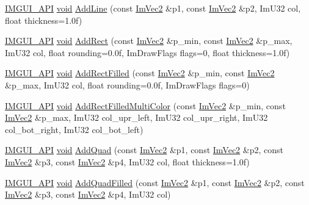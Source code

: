 \begin{DoxyCompactItemize}
\item 
\hyperlink{imgui_8h_a43829975e84e45d1149597467a14bbf5}{I\+M\+G\+U\+I\+\_\+\+A\+PI} \hyperlink{imgui__impl__opengl3__loader_8h_ac668e7cffd9e2e9cfee428b9b2f34fa7}{void} \hyperlink{structImDrawList_aa21e5a1c6e00239581f97d344fc0db61}{Add\+Line} (const \hyperlink{structImVec2}{Im\+Vec2} \&p1, const \hyperlink{structImVec2}{Im\+Vec2} \&p2, Im\+U32 col, float thickness=1.\+0f)
\item 
\hyperlink{imgui_8h_a43829975e84e45d1149597467a14bbf5}{I\+M\+G\+U\+I\+\_\+\+A\+PI} \hyperlink{imgui__impl__opengl3__loader_8h_ac668e7cffd9e2e9cfee428b9b2f34fa7}{void} \hyperlink{structImDrawList_ad96f10a3e954fe0c5b7c96d4e205af7b}{Add\+Rect} (const \hyperlink{structImVec2}{Im\+Vec2} \&p\+\_\+min, const \hyperlink{structImVec2}{Im\+Vec2} \&p\+\_\+max, Im\+U32 col, float rounding=0.\+0f, Im\+Draw\+Flags flags=0, float thickness=1.\+0f)
\item 
\hyperlink{imgui_8h_a43829975e84e45d1149597467a14bbf5}{I\+M\+G\+U\+I\+\_\+\+A\+PI} \hyperlink{imgui__impl__opengl3__loader_8h_ac668e7cffd9e2e9cfee428b9b2f34fa7}{void} \hyperlink{structImDrawList_a6b16ab764160b0251d2e7b3bd08c1ffc}{Add\+Rect\+Filled} (const \hyperlink{structImVec2}{Im\+Vec2} \&p\+\_\+min, const \hyperlink{structImVec2}{Im\+Vec2} \&p\+\_\+max, Im\+U32 col, float rounding=0.\+0f, Im\+Draw\+Flags flags=0)
\item 
\hyperlink{imgui_8h_a43829975e84e45d1149597467a14bbf5}{I\+M\+G\+U\+I\+\_\+\+A\+PI} \hyperlink{imgui__impl__opengl3__loader_8h_ac668e7cffd9e2e9cfee428b9b2f34fa7}{void} \hyperlink{structImDrawList_a6282e85ad78b01ebb74832336e9a2a55}{Add\+Rect\+Filled\+Multi\+Color} (const \hyperlink{structImVec2}{Im\+Vec2} \&p\+\_\+min, const \hyperlink{structImVec2}{Im\+Vec2} \&p\+\_\+max, Im\+U32 col\+\_\+upr\+\_\+left, Im\+U32 col\+\_\+upr\+\_\+right, Im\+U32 col\+\_\+bot\+\_\+right, Im\+U32 col\+\_\+bot\+\_\+left)
\item 
\hyperlink{imgui_8h_a43829975e84e45d1149597467a14bbf5}{I\+M\+G\+U\+I\+\_\+\+A\+PI} \hyperlink{imgui__impl__opengl3__loader_8h_ac668e7cffd9e2e9cfee428b9b2f34fa7}{void} \hyperlink{structImDrawList_a57b014138de51397db0570d88c770d9f}{Add\+Quad} (const \hyperlink{structImVec2}{Im\+Vec2} \&p1, const \hyperlink{structImVec2}{Im\+Vec2} \&p2, const \hyperlink{structImVec2}{Im\+Vec2} \&p3, const \hyperlink{structImVec2}{Im\+Vec2} \&p4, Im\+U32 col, float thickness=1.\+0f)
\item 
\hyperlink{imgui_8h_a43829975e84e45d1149597467a14bbf5}{I\+M\+G\+U\+I\+\_\+\+A\+PI} \hyperlink{imgui__impl__opengl3__loader_8h_ac668e7cffd9e2e9cfee428b9b2f34fa7}{void} \hyperlink{structImDrawList_a2b982fbad35f8736fdfc9d6e7db2ca94}{Add\+Quad\+Filled} (const \hyperlink{structImVec2}{Im\+Vec2} \&p1, const \hyperlink{structImVec2}{Im\+Vec2} \&p2, const \hyperlink{structImVec2}{Im\+Vec2} \&p3, const \hyperlink{structImVec2}{Im\+Vec2} \&p4, Im\+U32 col)

\end{DoxyCompactItemize}
